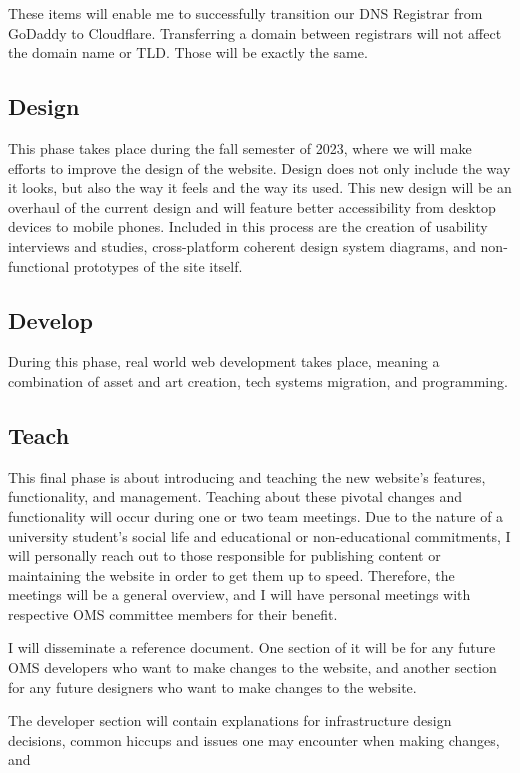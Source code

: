 These items will enable me to successfully transition our DNS Registrar from GoDaddy to Cloudflare. Transferring a domain between registrars will not affect the domain name or TLD. Those will be exactly the same.

\subsection{Design}
This phase takes place during the fall semester of 2023, where we will make efforts to improve the design of the website. Design does not only include the way it looks, but also the way it feels and the way its used. This new design will be an overhaul of the current design and will feature better accessibility from desktop devices to mobile phones. Included in this process are the creation of usability interviews and studies, cross-platform coherent design system diagrams, and non-functional prototypes of the site itself.

\subsection{Develop}
During this phase, real world web development takes place, meaning a combination of asset and art creation, tech systems migration, and programming.

\subsection{Teach}
This final phase is about introducing and teaching the new website's features, functionality, and management. Teaching about these pivotal changes and functionality will occur during one or two team meetings. Due to the nature of a university student's social life and educational or non-educational commitments, I will personally reach out to those responsible for publishing content or maintaining the website in order to get them up to speed. Therefore, the meetings will be a general overview, and I will have personal meetings with respective OMS committee members for their benefit.

I will disseminate a reference document. One section of it will be  for any future OMS developers who want to make changes to the website, and another section for any future designers who want to make changes to the website.

The developer section will contain explanations for infrastructure design decisions, common hiccups and issues one may encounter when making changes, and

